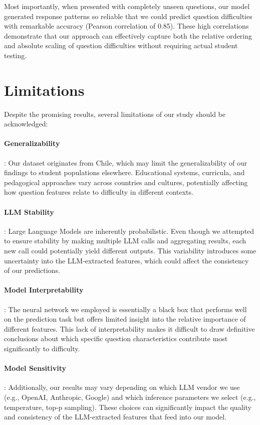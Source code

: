 \documentclass[11pt]{article}
\begin{document}
Most importantly, when presented with completely unseen questions, our model generated response patterns so reliable that we could predict question difficulties with remarkable accuracy (Pearson correlation of 0.85). These high correlations demonstrate that our approach can effectively capture both the relative ordering and absolute scaling of question difficulties without requiring actual student testing.

\section*{Limitations}

Despite the promising results, several limitations of our study should be acknowledged:

\paragraph{Generalizability}: Our dataset originates from Chile, which may limit the generalizability of our findings to student populations elsewhere. Educational systems, curricula, and pedagogical approaches vary across countries and cultures, potentially affecting how question features relate to difficulty in different contexts.

\paragraph{LLM Stability}: Large Language Models are inherently probabilistic. Even though we attempted to ensure stability by making multiple LLM calls and aggregating results, each new call could potentially yield different outputs. This variability introduces some uncertainty into the LLM-extracted features, which could affect the consistency of our predictions.

\paragraph{Model Interpretability}: The neural network we employed is essentially a black box that performs well on the prediction task but offers limited insight into the relative importance of different features. This lack of interpretability makes it difficult to draw definitive conclusions about which specific question characteristics contribute most significantly to difficulty.

\paragraph{Model Sensitivity}: Additionally, our results may vary depending on which LLM vendor we use (e.g., OpenAI, Anthropic, Google) and which inference parameters we select (e.g., temperature, top-p sampling). These choices can significantly impact the quality and consistency of the LLM-extracted features that feed into our model.
\end{document}
